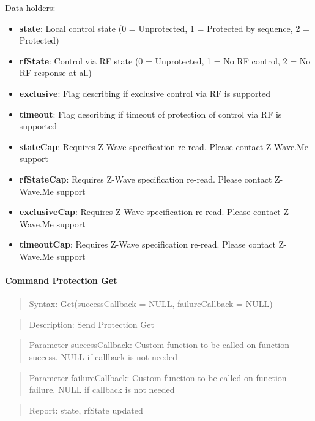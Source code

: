 \noindent
Data holders:

\begin{itemize}
\item \textbf{state}: Local control state (0 = Unprotected, 1 = Protected by sequence, 2 = Protected)
\item \textbf{rfState}: Control via RF state (0 = Unprotected, 1 = No RF control, 2 = No RF response at all)
\item \textbf{exclusive}: Flag describing if exclusive control via RF is supported
\item \textbf{timeout}: Flag describing if timeout of protection of control via RF is supported
\item \textbf{stateCap}: Requires Z-Wave specification re-read. Please contact Z-Wave.Me support
\item \textbf{rfStateCap}: Requires Z-Wave specification re-read. Please contact Z-Wave.Me support
\item \textbf{exclusiveCap}: Requires Z-Wave specification re-read. Please contact Z-Wave.Me support
\item \textbf{timeoutCap}: Requires Z-Wave specification re-read. Please contact Z-Wave.Me support
\end{itemize}

\paragraph{Command Protection Get}
\begin{quote}Syntax: Get(successCallback = NULL, failureCallback = NULL)\end{quote}
\begin{quote}Description: Send Protection Get\end{quote}
\begin{quote}Parameter successCallback: Custom function to be called on function success. NULL if callback is not needed\end{quote}
\begin{quote}Parameter failureCallback: Custom function to be called on function failure. NULL if callback is not needed\end{quote}
\begin{quote}Report: state, rfState updated\end{quote}

